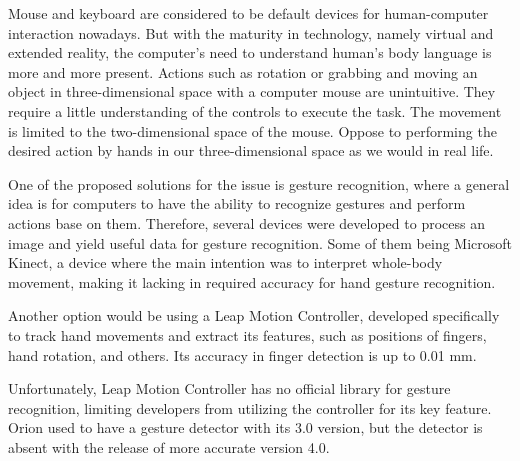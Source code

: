 Mouse and keyboard are considered to be default devices for human-computer interaction nowadays. But with the maturity in technology, namely virtual and extended reality, the computer's need to understand human's body language is more and more present. Actions such as rotation or grabbing and moving an object in three-dimensional space with a computer mouse are unintuitive. They require a little understanding of the controls to execute the task. The movement is limited to the two-dimensional space of the mouse. Oppose to performing the desired action by hands in our three-dimensional space as we would in real life.

One of the proposed solutions for the issue is gesture recognition, where a general idea is for computers to have the ability to recognize gestures and perform actions base on them. Therefore, several devices were developed to process an image and yield useful data for gesture recognition. Some of them being Microsoft Kinect, a device where the main intention was to interpret whole-body movement, making it lacking in required accuracy for hand gesture recognition. 

Another option would be using a Leap Motion Controller, developed specifically to track hand movements and extract its features, such as positions of fingers, hand rotation, and others. Its accuracy in finger detection is up to 0.01 mm.

Unfortunately, Leap Motion Controller has no official library for gesture recognition, limiting developers from utilizing the controller for its key feature. Orion used to have a gesture detector with its 3.0 version, but the detector is absent with the release of more accurate version 4.0.